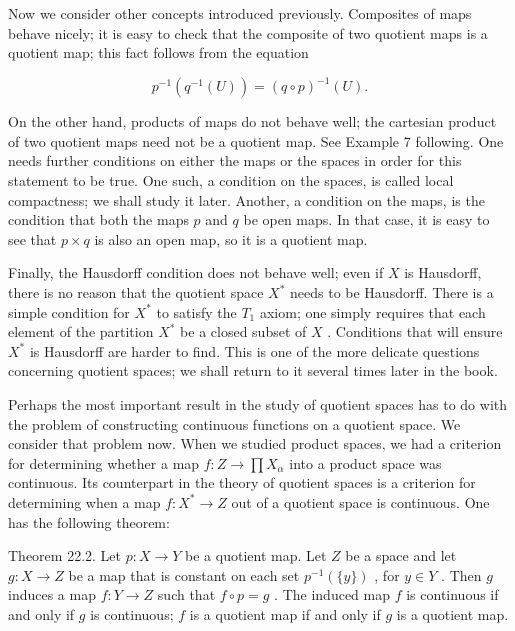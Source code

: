 \documentclass[10pt]{article}
\begin{document}
Now we consider other concepts introduced previously. Composites of maps behave nicely; it is easy to check that the composite of two quotient maps is a quotient map; this fact follows from the equation

\[
{p}^{-1}\left( {{q}^{-1}\left( U\right) }\right)  = {\left( q \circ  p\right) }^{-1}\left( U\right) .
\]

On the other hand, products of maps do not behave well; the cartesian product of two quotient maps need not be a quotient map. See Example 7 following. One needs further conditions on either the maps or the spaces in order for this statement to be true. One such, a condition on the spaces, is called local compactness; we shall study it later. Another, a condition on the maps, is the condition that both the maps \(p\) and \(q\) be open maps. In that case, it is easy to see that \(p \times  q\) is also an open map, so it is a quotient map.

Finally, the Hausdorff condition does not behave well; even if \(X\) is Hausdorff, there is no reason that the quotient space \({X}^{ * }\) needs to be Hausdorff. There is a simple condition for \({X}^{ * }\) to satisfy the \({T}_{1}\) axiom; one simply requires that each element of the partition \({X}^{ * }\) be a closed subset of \(X\) . Conditions that will ensure \({X}^{ * }\) is Hausdorff are harder to find. This is one of the more delicate questions concerning quotient spaces; we shall return to it several times later in the book.

Perhaps the most important result in the study of quotient spaces has to do with the problem of constructing continuous functions on a quotient space. We consider that problem now. When we studied product spaces, we had a criterion for determining whether a map \(f : Z \rightarrow  \prod {X}_{\alpha }\) into a product space was continuous. Its counterpart in the theory of quotient spaces is a criterion for determining when a map \(f : {X}^{ * } \rightarrow  Z\) out of a quotient space is continuous. One has the following theorem:

Theorem 22.2. Let \(p : X \rightarrow  Y\) be a quotient map. Let \(Z\) be a space and let \(g : X \rightarrow  Z\) be a map that is constant on each set \({p}^{-1}\left( {\{ y\} }\right)\) , for \(y \in  Y\) . Then \(g\) induces a map \(f : Y \rightarrow  Z\) such that \(f \circ  p = g\) . The induced map \(f\) is continuous if and only if \(g\) is continuous; \(f\) is a quotient map if and only if \(g\) is a quotient map.
\end{document}
